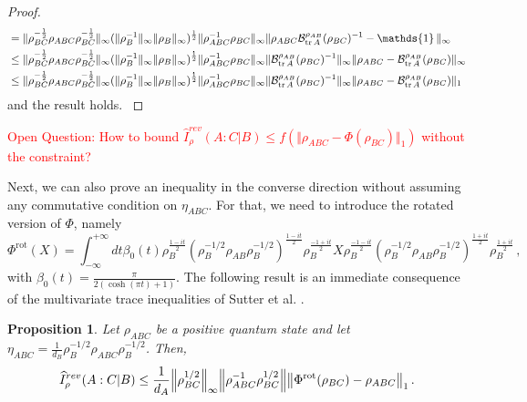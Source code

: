 \documentclass[11pt]{article}
\theoremstyle{newdefinition}
\theoremstyle{newplain}
\newtheorem{proposition}[definition]{Proposition}
\theoremstyle{myplain}
\DeclareMathOperator{\1}{\mathds{1}}
\newcommand{\PCR}[1]{{\color{blue}#1}}
\begin{document}
{\begin{proof}
{\begin{equation}
\begin{split}
        &= \Vert \rho_{BC}^{-\frac{1}{2}}\rho_{ABC}\rho_{BC}^{-\frac{1}{2}}\Vert_{\infty}(\Vert \rho_B^{-1}\Vert_{\infty} \Vert \rho_B \Vert_{\infty})^{\frac{1}{2}}\Vert \rho_{ABC}^{-1}\rho_{BC}\Vert_{\infty}\Vert \rho_{ABC}\mathcal{B}_{\tr A}^{\rho_{AB}}(\rho_{BC})^{-1}- \1 \Vert_{\infty}\\
        & \leq \Vert \rho_{BC}^{-\frac{1}{2}}\rho_{ABC}\rho_{BC}^{-\frac{1}{2}}\Vert_{\infty}(\Vert \rho_B^{-1}\Vert_{\infty} \Vert \rho_B \Vert_{\infty})^{\frac{1}{2}}\Vert \rho_{ABC}^{-1}\rho_{BC}\Vert_{\infty} \Vert\mathcal{B}_{\tr A}^{\rho_{AB}}(\rho_{BC})^{-1} \Vert_{\infty}   \Vert \rho_{ABC}-\mathcal{B}_{\tr A}^{\rho_{AB}}(\rho_{BC})\Vert_{\infty}\\
         & \leq \Vert \rho_{BC}^{-\frac{1}{2}}\rho_{ABC}\rho_{BC}^{-\frac{1}{2}}\Vert_{\infty}(\Vert \rho_B^{-1}\Vert_{\infty} \Vert \rho_B \Vert_{\infty})^{\frac{1}{2}}\Vert \rho_{ABC}^{-1}\rho_{BC}\Vert_{\infty} \Vert\mathcal{B}_{\tr A}^{\rho_{AB}}(\rho_{BC})^{-1} \Vert_{\infty}   \Vert \rho_{ABC}-\mathcal{B}_{\tr A}^{\rho_{AB}}(\rho_{BC})\Vert_{1}\\
    \end{split}
\end{equation}
and the result holds.
}

 \end{proof}
   
\textcolor{red}{Open Question: How to bound $\widehat{I}^{rev}_{\rho}(A:C | B)\leq f(\Vert  \rho_{ABC}-\Phi(\rho_{BC})\Vert_1)$ without the constraint?
    }


Next, we can \PCR{ also } prove an inequality in the converse direction \PCR{without assuming any commutative condition on  $\eta_{ABC}$}. For that, we need to introduce the rotated version of $\Phi$, namely
\begin{equation}
    \Phi^{\text{rot}} (X) = \int_{-\infty}^{+\infty} dt \beta_0(t) \rho_B^{\frac{1-it}{2}}(\rho_B^{-1/2}\rho_{AB}\rho_B^{-1/2})^{\frac{1-it}{2}}\rho_B^{\frac{-1+it}{2}}X\rho_B^{\frac{-1-it}{2}}(\rho_B^{-1/2}\rho_{AB}\rho_B^{-1/2})^{\frac{1+it}{2}}\rho_B^{\frac{1+it}{2}} \, , 
\end{equation}
with $\beta_0(t)= \frac{\pi}{2( \cosh (\pi t) +1)}$.
The following result is an immediate consequence of the multivariate trace inequalities of Sutter et al. \cite{Sutter2017b}.

\begin{proposition}
 Let $\rho_{ABC}$ be a positive quantum state and let $\eta_{ABC}= \frac{1}{d_B} \rho_B^{-1/2} \rho_{ABC}\rho_B^{-1/2} $. Then,
 \begin{equation}
      \widehat{I}^{rev}_{\rho}(A:C | B) \leq \frac{1}{d_A} \norm{\rho_{BC}^{1/2}}_\infty \norm{\rho_{ABC}^{-1} \rho_{BC}^{1/2}} \norm{  \Phi^{\text{rot}} (\rho_{BC}) -\rho_{ABC}}_1 \, .
 \end{equation}
\end{proposition}

}
\end{document}
